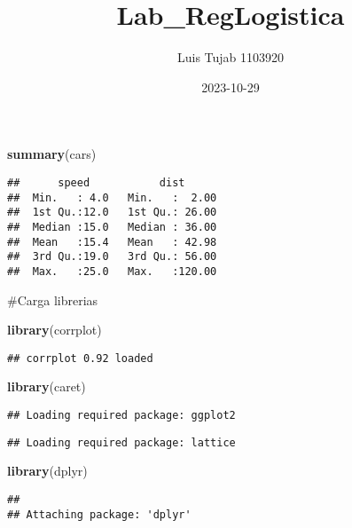 \documentclass[
]{article}
\title{Lab\_RegLogistica}
\author{Luis Tujab 1103920}
\date{2023-10-29}
\newenvironment{Shaded}{\begin{snugshade}}{\end{snugshade}}
\newcommand{\FunctionTok}[1]{\textcolor[rgb]{0.13,0.29,0.53}{\textbf{#1}}}
\newcommand{\NormalTok}[1]{#1}
\begin{document}
\maketitle

\begin{Shaded}
\begin{Highlighting}[]
\FunctionTok{summary}\NormalTok{(cars)}
\end{Highlighting}
\end{Shaded}

\begin{verbatim}
##      speed           dist       
##  Min.   : 4.0   Min.   :  2.00  
##  1st Qu.:12.0   1st Qu.: 26.00  
##  Median :15.0   Median : 36.00  
##  Mean   :15.4   Mean   : 42.98  
##  3rd Qu.:19.0   3rd Qu.: 56.00  
##  Max.   :25.0   Max.   :120.00
\end{verbatim}

\#Carga librerias

\begin{Shaded}
\begin{Highlighting}[]
\FunctionTok{library}\NormalTok{(corrplot)}
\end{Highlighting}
\end{Shaded}

\begin{verbatim}
## corrplot 0.92 loaded
\end{verbatim}

\begin{Shaded}
\begin{Highlighting}[]
\FunctionTok{library}\NormalTok{(caret)}
\end{Highlighting}
\end{Shaded}

\begin{verbatim}
## Loading required package: ggplot2
\end{verbatim}

\begin{verbatim}
## Loading required package: lattice
\end{verbatim}

\begin{Shaded}
\begin{Highlighting}[]
\FunctionTok{library}\NormalTok{(dplyr)}
\end{Highlighting}
\end{Shaded}

\begin{verbatim}
## 
## Attaching package: 'dplyr'
\end{verbatim}
\end{document}
